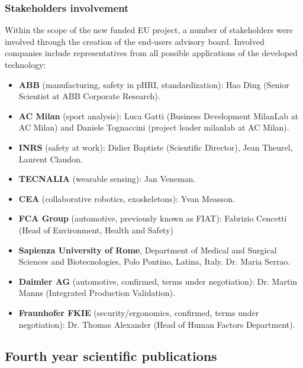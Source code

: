 \documentclass[12pt,a4paper,twoside]{article}
\begin{document}
\subsubsection{Stakeholders involvement}

Within the scope of the new funded EU project, a number of stakeholders were
involved through the creation of the end-users advisory board. Involved companies 
include representatives from all possible applications of the developed technology:

\begin{itemize}
\item \textbf{ABB} (manufacturing, safety in pHRI, standardization): Hao Ding (Senior Scientist at ABB Corporate Research).
\item \textbf{AC Milan} (sport analysis): Luca Gatti (Business Development MilanLab at AC Milan) and Daniele Tognaccini (project leader milanlab at AC Milan).
\item \textbf{INRS} (safety at work): Didier Baptiste (Scientific Director), Jean Theurel, Laurent Claudon.
\item \textbf{TECNALIA} (wearable sensing): Jan Veneman.
\item \textbf{CEA} (collaborative robotics, exoskeletons): Yvan Measson.
\item \textbf{FCA Group} (automotive, previously known as FIAT): Fabrizio Cencetti (Head of Environment, Health and Safety)
\item \textbf{Sapienza University of Rome}, Department of Medical and Surgical Sciences and Biotecnologies, Polo Pontino, Latina, Italy. Dr. Maria Serrao. 
\item \textbf{Daimler AG} (automotive, confirmed, terms under negotiation): Dr. Martin Manns (Integrated Production Validation).
\item \textbf{Fraunhofer FKIE} (security/ergonomics, confirmed, terms under negotiation): Dr. Thomas Alexander (Head of Human Factors Department).
\end{itemize}

\subsection{Fourth year scientific publications}
\makeatletter
\renewcommand\@biblabel[1]{}
\makeatother
\end{document}

